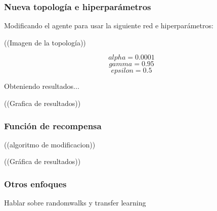 \subsubsection*{Nueva topología e hiperparámetros}
Modificando el agente para usar la siguiente red e hiperparámetros:

((Imagen de la topología))

$$ alpha = 0.0001$$
$$ gamma = 0.95$$
$$ epsilon = 0.5$$
$$  $$

Obteniendo resultados... 

((Grafica de resultados))

\subsubsection*{Función de recompensa}

((algoritmo de modificacion))

((Gráfica de resultados))

\subsubsection*{Otros enfoques}
Hablar sobre randomwalks y transfer learning